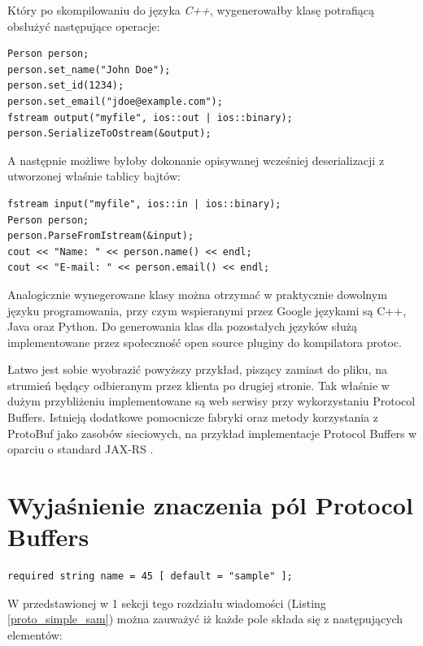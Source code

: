 Który po skompilowaniu do języka \textit{C++}, wygenerowałby klasę potrafiącą obsłużyć następujące operacje:

\begin{lstlisting}[caption={Przykład klasy ProtoBuf w C++, pisanej na plik}]
Person person;
person.set_name("John Doe");
person.set_id(1234);
person.set_email("jdoe@example.com");
fstream output("myfile", ios::out | ios::binary);
person.SerializeToOstream(&output);
\end{lstlisting}

A następnie możliwe byłoby dokonanie opisywanej wcześniej deserializacji z utworzonej właśnie tablicy bajtów:

\begin{lstlisting}[caption={Przykład klasy ProtoBuf w C++, odczytującej ,,się'' z zapisanego wcześniej binarnego pliku}]
fstream input("myfile", ios::in | ios::binary);
Person person;
person.ParseFromIstream(&input);
cout << "Name: " << person.name() << endl;
cout << "E-mail: " << person.email() << endl;
\end{lstlisting}

Analogicznie wynegerowane klasy można otrzymać w praktycznie dowolnym języku programowania, 
przy czym wspieranymi przez Google językami są C++, Java oraz Python. Do generowania klas dla pozostałych języków
służą implementowane przez społeczność open source pluginy do kompilatora protoc.

Łatwo jest sobie wyobrazić powyższy przykład, piszący zamiast do pliku, na strumień będący odbieranym przez klienta po drugiej stronie.
Tak właśnie w dużym przybliżeniu implementowane są web serwisy przy wykorzystaniu Protocol Buffers. Istnieją dodatkowe pomocnicze fabryki oraz metody
korzystania z ProtoBuf jako zasobów sieciowych, na przykład implementacje Protocol Buffers w oparciu o standard JAX-RS \cite{jaxrs}.


\section{Wyjaśnienie znaczenia pól Protocol Buffers}
\label{sec:typeQialifiers}

\begin{lstlisting}[caption={Przypomnienie wyglądu deklaracji pola wiadomości}]
 required string name = 45 [ default = "sample" ];
\end{lstlisting}

W przedstawionej w 1 sekcji tego rozdziału wiadomości (Listing \ref{proto_simple_sam}) można zauważyć iż każde pole składa się z następujących elementów:

